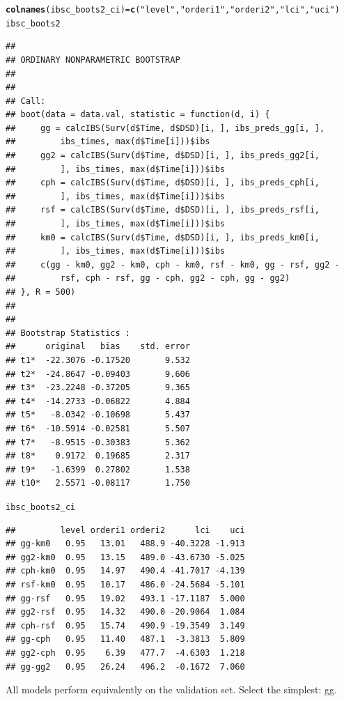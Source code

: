 \documentclass{article}\usepackage[]{graphicx}\usepackage[]{color}
\makeatletter
\newcommand{\hlstr}[1]{\textcolor[rgb]{0.192,0.494,0.8}{#1}}%
\newcommand{\hlstd}[1]{\textcolor[rgb]{0.345,0.345,0.345}{#1}}%
\newcommand{\hlkwb}[1]{\textcolor[rgb]{0.69,0.353,0.396}{#1}}%
\newcommand{\hlkwd}[1]{\textcolor[rgb]{0.737,0.353,0.396}{\textbf{#1}}}%
\newenvironment{kframe}{%
 \def\at@end@of@kframe{}%
 \ifinner\ifhmode%
  \def\at@end@of@kframe{\end{minipage}}%
  \begin{minipage}{\columnwidth}%
 \fi\fi%
 \def\FrameCommand##1{\hskip\@totalleftmargin \hskip-\fboxsep
 \colorbox{shadecolor}{##1}\hskip-\fboxsep
     \hskip-\linewidth \hskip-\@totalleftmargin \hskip\columnwidth}%
 \MakeFramed {\advance\hsize-\width
   \@totalleftmargin\z@ \linewidth\hsize
   \@setminipage}}%
 {\par\unskip\endMakeFramed%
 \at@end@of@kframe}
\newenvironment{knitrout}{}{} %
\makeatother
\begin{document}
\begin{knitrout}
\begin{kframe}
\begin{alltt}
\hlkwd{colnames}\hlstd{(ibsc_boots2_ci)} \hlkwb{=} \hlkwd{c}\hlstd{(}\hlstr{"level"}\hlstd{,} \hlstr{"orderi1"}\hlstd{,} \hlstr{"orderi2"}\hlstd{,} \hlstr{"lci"}\hlstd{,} \hlstr{"uci"}\hlstd{)}
\hlstd{ibsc_boots2}
\end{alltt}
\begin{verbatim}
## 
## ORDINARY NONPARAMETRIC BOOTSTRAP
## 
## 
## Call:
## boot(data = data.val, statistic = function(d, i) {
##     gg = calcIBS(Surv(d$Time, d$DSD)[i, ], ibs_preds_gg[i, ], 
##         ibs_times, max(d$Time[i]))$ibs
##     gg2 = calcIBS(Surv(d$Time, d$DSD)[i, ], ibs_preds_gg2[i, 
##         ], ibs_times, max(d$Time[i]))$ibs
##     cph = calcIBS(Surv(d$Time, d$DSD)[i, ], ibs_preds_cph[i, 
##         ], ibs_times, max(d$Time[i]))$ibs
##     rsf = calcIBS(Surv(d$Time, d$DSD)[i, ], ibs_preds_rsf[i, 
##         ], ibs_times, max(d$Time[i]))$ibs
##     km0 = calcIBS(Surv(d$Time, d$DSD)[i, ], ibs_preds_km0[i, 
##         ], ibs_times, max(d$Time[i]))$ibs
##     c(gg - km0, gg2 - km0, cph - km0, rsf - km0, gg - rsf, gg2 - 
##         rsf, cph - rsf, gg - cph, gg2 - cph, gg - gg2)
## }, R = 500)
## 
## 
## Bootstrap Statistics :
##      original   bias    std. error
## t1*  -22.3076 -0.17520       9.532
## t2*  -24.8647 -0.09403       9.606
## t3*  -23.2248 -0.37205       9.365
## t4*  -14.2733 -0.06822       4.884
## t5*   -8.0342 -0.10698       5.437
## t6*  -10.5914 -0.02581       5.507
## t7*   -8.9515 -0.30383       5.362
## t8*    0.9172  0.19685       2.317
## t9*   -1.6399  0.27802       1.538
## t10*   2.5571 -0.08117       1.750
\end{verbatim}
\begin{alltt}
\hlstd{ibsc_boots2_ci}
\end{alltt}
\begin{verbatim}
##         level orderi1 orderi2      lci    uci
## gg-km0   0.95   13.01   488.9 -40.3228 -1.913
## gg2-km0  0.95   13.15   489.0 -43.6730 -5.025
## cph-km0  0.95   14.97   490.4 -41.7017 -4.139
## rsf-km0  0.95   10.17   486.0 -24.5684 -5.101
## gg-rsf   0.95   19.02   493.1 -17.1187  5.000
## gg2-rsf  0.95   14.32   490.0 -20.9064  1.084
## cph-rsf  0.95   15.74   490.9 -19.3549  3.149
## gg-cph   0.95   11.40   487.1  -3.3813  5.809
## gg2-cph  0.95    6.39   477.7  -4.6303  1.218
## gg-gg2   0.95   26.24   496.2  -0.1672  7.060
\end{verbatim}
\end{kframe}
\end{knitrout}
All models perform equivalently on the validation set.  Select the simplest: gg.
\end{document}
